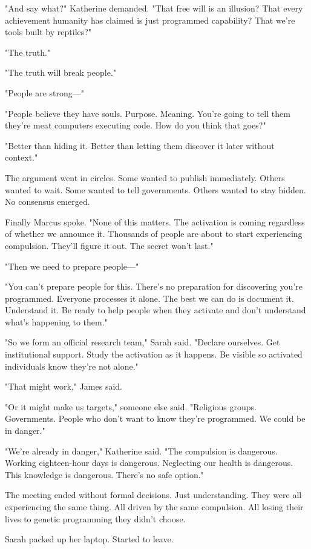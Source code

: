 "And say what?" Katherine demanded. "That free will is an illusion? That every achievement humanity has claimed is just programmed capability? That we're tools built by reptiles?"

"The truth."

"The truth will break people."

"People are strong—"

"People believe they have souls. Purpose. Meaning. You're going to tell them they're meat computers executing code. How do you think that goes?"

"Better than hiding it. Better than letting them discover it later without context."

The argument went in circles. Some wanted to publish immediately. Others wanted to wait. Some wanted to tell governments. Others wanted to stay hidden. No consensus emerged.

Finally Marcus spoke. "None of this matters. The activation is coming regardless of whether we announce it. Thousands of people are about to start experiencing compulsion. They'll figure it out. The secret won't last."

"Then we need to prepare people—"

"You can't prepare people for this. There's no preparation for discovering you're programmed. Everyone processes it alone. The best we can do is document it. Understand it. Be ready to help people when they activate and don't understand what's happening to them."

"So we form an official research team," Sarah said. "Declare ourselves. Get institutional support. Study the activation as it happens. Be visible so activated individuals know they're not alone."

"That might work," James said.

"Or it might make us targets," someone else said. "Religious groups. Governments. People who don't want to know they're programmed. We could be in danger."

"We're already in danger," Katherine said. "The compulsion is dangerous. Working eighteen-hour days is dangerous. Neglecting our health is dangerous. This knowledge is dangerous. There's no safe option."

The meeting ended without formal decisions. Just understanding. They were all experiencing the same thing. All driven by the same compulsion. All losing their lives to genetic programming they didn't choose.

Sarah packed up her laptop. Started to leave.

